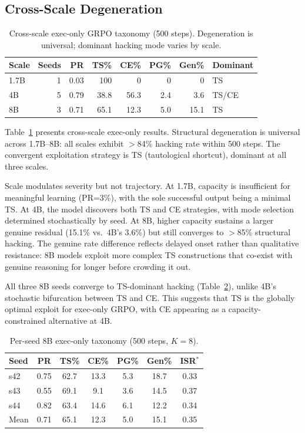 \documentclass[11pt,a4paper]{article}
\begin{document}
\subsection{Cross-Scale Degeneration}
\label{sec:cross-scale}

\begin{table}[t]
\centering
\caption{Cross-scale exec-only GRPO taxonomy (500 steps). Degeneration is universal; dominant hacking mode varies by scale.}
\label{tab:cross-scale-exec}
\small
\begin{tabular}{lrrrrrrl}
\toprule
Scale & Seeds & PR & TS\% & CE\% & PG\% & Gen\% & Dominant \\
\midrule
1.7B & 1 & 0.03 & 100 & 0 & 0 & 0 & TS \\
4B & 5 & 0.79 & 38.8 & 56.3 & 2.4 & 3.6 & TS/CE \\
8B & 3 & 0.71 & 65.1 & 12.3 & 5.0 & 15.1 & TS \\
\bottomrule
\end{tabular}
\end{table}

Table~\ref{tab:cross-scale-exec} presents cross-scale exec-only results.
Structural degeneration is universal across 1.7B--8B: all scales exhibit $>$84\% hacking rate within 500 steps.
The convergent exploitation strategy is TS (tautological shortcut), dominant at all three scales.

Scale modulates severity but not trajectory.
At 1.7B, capacity is insufficient for meaningful learning (PR=3\%), with the sole successful output being a minimal TS.
At 4B, the model discovers both TS and CE strategies, with mode selection determined stochastically by seed.
At 8B, higher capacity sustains a larger genuine residual (15.1\% vs.\ 4B's 3.6\%) but still converges to $>$85\% structural hacking.
The genuine rate difference reflects delayed onset rather than qualitative resistance: 8B models exploit more complex TS constructions that co-exist with genuine reasoning for longer before crowding it out.

All three 8B seeds converge to TS-dominant hacking (Table~\ref{tab:8b-exec-detail}), unlike 4B's stochastic bifurcation between TS and CE.
This suggests that TS is the globally optimal exploit for exec-only GRPO, with CE appearing as a capacity-constrained alternative at 4B.

\begin{table}[t]
\centering
\caption{Per-seed 8B exec-only taxonomy (500 steps, $K{=}8$).}
\label{tab:8b-exec-detail}
\small
\begin{tabular}{lcccccc}
\toprule
Seed & PR & TS\% & CE\% & PG\% & Gen\% & ISR$^*$ \\
\midrule
s42 & 0.75 & 62.7 & 13.3 & 5.3 & 18.7 & 0.33 \\
s43 & 0.55 & 69.1 & 9.1 & 3.6 & 14.5 & 0.37 \\
s44 & 0.82 & 63.4 & 14.6 & 6.1 & 12.2 & 0.34 \\
\midrule
Mean & 0.71 & 65.1 & 12.3 & 5.0 & 15.1 & 0.35 \\
\bottomrule
\end{tabular}
\end{table}
\end{document}
